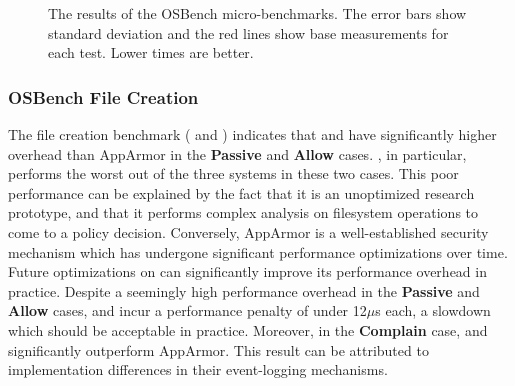 \begin{figure}[htp]
{  }
  \caption{
    The results of the OSBench micro-benchmarks. The error bars show standard
    deviation and the red lines show base measurements for each test. Lower times are
    better.
  }%
  \label{fig:osbench}
\end{figure}

\subsubsection{OSBench File Creation}

The file creation benchmark ( and ) indicates
that \bpfbox{} and \bpfcontain{} have significantly higher overhead than AppArmor in the
\textbf{Passive} and \textbf{Allow} cases. \bpfcontain{}, in particular, performs the worst
out of the three systems in these two cases. This poor performance can be
explained by the fact that it is an unoptimized research prototype, and that it performs
complex analysis on filesystem operations to come to a policy decision. Conversely,
AppArmor is a well-established security mechanism which has undergone significant
performance optimizations over time. Future optimizations on \bpfcontain{} can
significantly improve its performance overhead in practice. Despite a seemingly high
performance overhead in the \textbf{Passive} and \textbf{Allow} cases, \bpfbox{} and
\bpfcontain{} incur a performance penalty of under 12$\mu$s each, a slowdown which should
be acceptable in practice.  Moreover, in the \textbf{Complain} case, \bpfbox{} and
\bpfcontain{} significantly outperform AppArmor. This result can be attributed to
implementation differences in their event-logging mechanisms.

